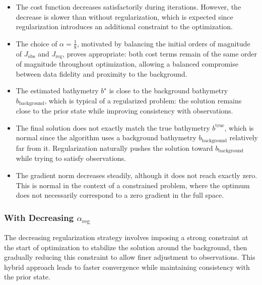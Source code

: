 \documentclass{article}
\begin{document}
\begin{itemize}
    \item The cost function decreases satisfactorily during iterations. However, the decrease is slower than without regularization, which is expected since regularization introduces an additional constraint to the optimization.
    
    \item The choice of \( \alpha = \frac{1}{8} \), motivated by balancing the initial orders of magnitude of \( J_{\text{obs}} \) and \( J_{\text{reg}} \), proves appropriate: both cost terms remain of the same order of magnitude throughout optimization, allowing a balanced compromise between data fidelity and proximity to the background.
    
    \item The estimated bathymetry \( b^\star \) is close to the background bathymetry \( b_{\text{background}} \), which is typical of a regularized problem: the solution remains close to the prior state while improving consistency with observations.
    
    \item The final solution does not exactly match the true bathymetry \( b^{\text{true}} \), which is normal since the algorithm uses a background bathymetry \( b_{\text{background}} \) relatively far from it. Regularization naturally pushes the solution toward \( b_{\text{background}} \) while trying to satisfy observations.
    
    \item The gradient norm decreases steadily, although it does not reach exactly zero. This is normal in the context of a constrained problem, where the optimum does not necessarily correspond to a zero gradient in the full space.
\end{itemize}

\subsubsection{With Decreasing \( \alpha_{\text{reg}} \)}

The decreasing regularization strategy involves imposing a strong constraint at the start of optimization to stabilize the solution around the background, then gradually reducing this constraint to allow finer adjustment to observations. This hybrid approach leads to faster convergence while maintaining consistency with the prior state.
\end{document}
